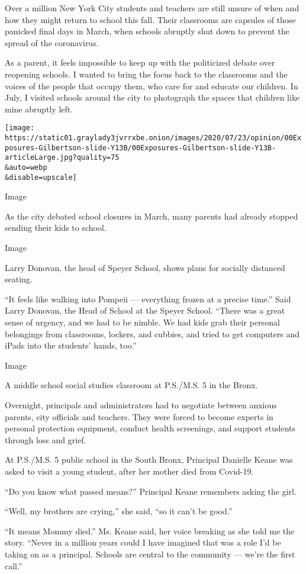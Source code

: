 Over a million New York City students and teachers are still unsure of
when and how they might return to school this fall. Their classrooms are
capsules of those panicked final days in March, when schools abruptly
shut down to prevent the spread of the coronavirus.

As a parent, it feels impossible to keep up with the politicized debate
over reopening schools. I wanted to bring the focus back to the
classrooms and the voices of the people that occupy them, who care for
and educate our children. In July, I visited schools around the city to
photograph the spaces that children like mine abruptly left.

\texttt{[image: https://static01.graylady3jvrrxbe.onion/images/2020/07/23/opinion/00Exposures-Gilbertson-slide-Y13B/00Exposures-Gilbertson-slide-Y13B-articleLarge.jpg?quality=75\\\&auto=webp\\\&disable=upscale]}

Image

As the city debated school closures in March, many parents had already
stopped sending their kids to school.

Image

Larry Donovan, the head of Speyer School, shows plans for socially
distanced seating.

``It feels like walking into Pompeii --- everything frozen at a precise
time.'' Said Larry Donovan, the Head of School at the Speyer School.
``There was a great sense of urgency, and we had to be nimble. We had
kids grab their personal belongings from classrooms, lockers, and
cubbies, and tried to get computers and iPads into the students' hands,
too.''

Image

A middle school social studies classroom at P.S./M.S. 5 in the Bronx.

Overnight, principals and administrators had to negotiate between
anxious parents, city officials and teachers. They were forced to become
experts in personal protection equipment, conduct health screenings, and
support students through loss and grief.

At P.S./M.S. 5 public school in the South Bronx, Principal Danielle
Keane was asked to visit a young student, after her mother died from
Covid-19.

``Do you know what passed means?'' Principal Keane remembers asking the
girl.

``Well, my brothers are crying,'' she said, ``so it can't be good.''

``It means Mommy died.'' Ms. Keane said, her voice breaking as she told
me the story. ``Never in a million years could I have imagined that was
a role I'd be taking on as a principal. Schools are central to the
community --- we're the first call.''

